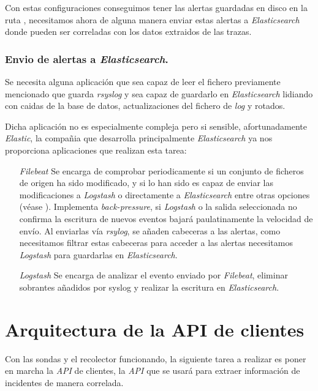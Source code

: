 Con estas configuraciones conseguimos tener las alertas guardadas en disco en la ruta , necesitamos
ahora de alguna manera enviar estas alertas a \emph{Elasticsearch} donde pueden ser correladas con los datos extraidos de las trazas.

\subsubsection{Envio de alertas a \emph{Elasticsearch}.}

Se necesita alguna aplicación que sea capaz de leer el fichero previamente mencionado que guarda \emph{rsyslog} y sea capaz de guardarlo
en \emph{Elasticsearch} lidiando con caidas de la base de datos, actualizaciones del fichero de \emph{log} y rotados.

Dicha aplicación no es especialmente compleja pero si sensible, afortunadamente \emph{Elastic}, la compañia que desarrolla principalmente
\emph{Elasticsearch} ya nos proporciona aplicaciones que realizan esta tarea:

\begin{itemize}
    \item[\emph{Filebeat}] Se encarga de comprobar periodicamente si un conjunto de ficheros de origen ha sido modificado, y si lo han sido
    es capaz de enviar las modificaciones a \emph{Logstash} o directamente a \emph{Elasticsearch} entre otras opciones (véase \cite{elastic-filebeat}). Implementa 
    \emph{back-pressure}, si \emph{Logstash} o la salida seleccionada no confirma la escritura de nuevos eventos bajará paulatinamente la velocidad de envío. 
    Al enviarlas vía \emph{rsylog}, se añaden cabeceras a las alertas, como necesitamos filtrar estas cabeceras para acceder a las alertas necesitamos \emph{Logstash} para 
    guardarlas en \emph{Elasticsearch}.
    \item[\emph{Logstash}] Se encarga de analizar el evento enviado por \emph{Filebeat}, eliminar sobrantes añadidos por syslog y realizar la escritura en
    \emph{Elasticsearch}.
\end{itemize}

\section{Arquitectura de la API de clientes}
\label{sec:arquitectura-api-clientes}

Con las sondas y el recolector funcionando, la siguiente tarea a realizar es poner en marcha la \emph{API} de clientes, 
la \emph{API} que se usará para extraer información de incidentes de manera correlada.

